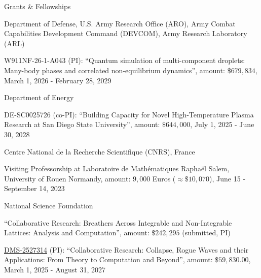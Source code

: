 \documentclass[10pt]{article} %
\newenvironment{outerlist}[1][\enskip\textbullet]%
        {\begin{itemize}[#1]}{\end{itemize}%
         \vspace{-.6\baselineskip}}
\newenvironment{innerlist}[1][\enskip\textbullet]%
        {\begin{compactitem}[#1]}{\end{compactitem}}
\begin{document}
\begin{section}{Grants \& Fellowships}
\begin{outerlist}
\item[$\bullet$]
\vskip -7mm
Department of Defense, U.S. Army Research Office (ARO), Army Combat Capabilities Development Command (DEVCOM), Army Research Laboratory (ARL)
\begin{innerlist}
\item[$\triangleright$]  W911NF-26-1-A043 (PI): ``Quantum simulation of multi-component droplets: Many-body phases and correlated non-equilibrium dynamics'', amount: $\$679,834$,  March 1, 2026 - February 28, 2029
\end{innerlist}
\item[$\bullet$] Department of Energy
\begin{innerlist}
\item[$\triangleright$] DE-SC0025726 (co-PI): ``Building Capacity for Novel High-Temperature Plasma Research at
San Diego State University'', amount: $\$644,000$, July 1, 2025 - June 30, 2028
\end{innerlist}
\item [$\bullet$] Centre National de la Recherche Scientifique (CNRS), France
\begin{innerlist}
\item[$\triangleright$] Visiting Professorship at Laboratoire de Math\'ematiques
Rapha\"el Salem, University of Rouen Normandy, amount: $9,000$ Euros ($\approx \$10,070$),
June 15 - September 14, 2023
\end{innerlist}
\item[$\bullet$]
National Science Foundation
\begin{innerlist}
\item[$\triangleright$] ``Collaborative Research: Breathers Across Integrable and Non-Integrable Lattices: Analysis and Computation'', amount: $\$242,295$  (submitted, PI)
%
\item[$\triangleright$] \href{https://www.nsf.gov/awardsearch/showAward?AWD_ID=2527314&HistoricalAwards=false}{DMS-2527314} (PI): %
``Collaborative Research: Collapse, Rogue Waves and their Applications: From Theory to Computation and Beyond'', %
amount: $\$59,830.00$, March 1, 2025 - August 31, 2027

\end{innerlist}
\end{outerlist}
\end{section}
\end{document}
